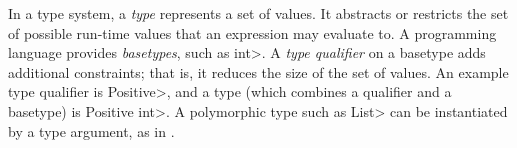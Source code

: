 % 
% 
% 
% 





In a type system,
a \textit{type} represents a set of values.  It abstracts or restricts the
set of possible run-time values that an expression may evaluate to.
A programming language provides \emph{basetypes}, such as \<int>.
A \textit{type qualifier} on a basetype adds additional constraints;
that is, it reduces the size of the set of values.
An example type qualifier is \<Positive>, and a type (which combines a qualifier
and a basetype) is \<Positive int>.
A polymorphic type such as \<List> can be instantiated by a type argument,
as in .


